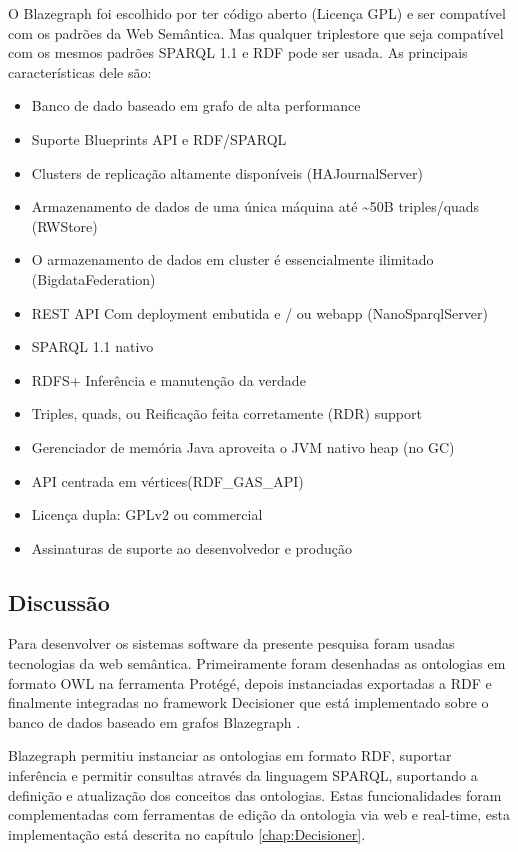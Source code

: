 O Blazegraph foi escolhido por ter código aberto (Licença GPL) e ser
compatível com os padrões da Web Semântica. Mas qualquer \foreignlanguage{english}{triplestore}
que seja compatível com os mesmos padrões SPARQL 1.1 e RDF pode ser
usada. As principais características dele são:
\begin{itemize}
\item Banco de dado baseado em grafo de alta performance
\item Suporte Blueprints API e RDF/SPARQL
\item Clusters de replicação altamente disponíveis (HAJournalServer) 
\item Armazenamento de dados de uma única máquina até \textasciitilde{}50B
triples/quads (RWStore) 
\item O armazenamento de dados em cluster é essencialmente ilimitado (BigdataFederation) 
\item REST API Com deployment embutida e / ou webapp (NanoSparqlServer) 
\item SPARQL 1.1 nativo 
\item RDFS+ Inferência e manutenção da verdade
\item Triples, quads, ou Reificação feita corretamente (RDR) support 
\item Gerenciador de memória Java aproveita o JVM nativo heap (no GC) 
\item API centrada em vértices(RDF\_GAS\_API) 
\item Licença dupla: GPLv2 ou commercial 
\item Assinaturas de suporte ao desenvolvedor e produção
\end{itemize}

\subsection*{Discussão }

Para desenvolver os sistemas software da presente pesquisa foram usadas
tecnologias da web semântica. Primeiramente foram desenhadas as ontologias
em formato \foreignlanguage{english}{OWL} na ferramenta Protégé, depois
instanciadas exportadas a RDF e finalmente integradas no framework
Decisioner que está implementado sobre o banco de dados baseado em
grafos \foreignlanguage{english}{Blazegraph} .

%
Blazegraph\foreignlanguage{brazil}{ permitiu instanciar as ontologias
em formato }RDF,\foreignlanguage{brazil}{ suportar inferência e permitir
consultas através da linguagem }SPARQL,\foreignlanguage{brazil}{ suportando
a definição e atualização dos conceitos das ontologias. Estas funcionalidades
foram complementadas com ferramentas de edição da ontologia via web
e }real-time\foreignlanguage{brazil}{, esta implementação está descrita
no capítulo \ref{chap:Decisioner}. }


